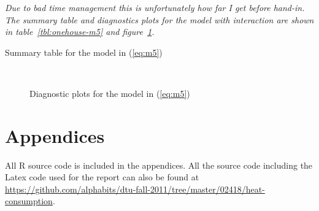 \textit{Due to bad time management this is unfortunately how far I get before hand-in. The summary table and diagnostics plots for the model with interaction are shown in table~\ref{tbl:onehouse-m5} and figure~\ref{fig:onehouse-m5-diagnostics}.}

\begin{table}[ht]
    \centering
    
    \caption{Summary table for the model in (\ref{eq:m5})}\label{tbl:onehouse-m5}
\end{table}
\begin{figure}[ht]
    \centering
    \mbox{ \quad 
          }
    \caption{Diagnostic plots for the model in (\ref{eq:m5})}
    \label{fig:onehouse-m5-diagnostics}
\end{figure}

\pagebreak

\renewcommand\thesection{\Alph{section}}
\section{Appendices}
All R source code is included in the appendices. All the source code including the Latex code used for the report can also be found at \url{https://github.com/alphabits/dtu-fall-2011/tree/master/02418/heat-consumption}.
